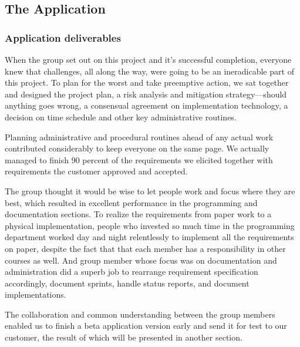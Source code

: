 \subsection{The Application}
    \subsubsection{Application deliverables}
    When the group set out on this project and it's successful completion, everyone knew that challenges, all along the way, were going to be an ineradicable part of this project. To plan for the worst and take preemptive action, we sat together and designed the project plan, a risk analysis and mitigation strategy---should anything goes wrong, a consensual agreement on implementation technology, a decision on time schedule and other key administrative routines.

    Planning administrative and procedural routines ahead of any actual work contributed considerably to keep everyone on the same page. We actually managed to finish 90 percent of the requirements we elicited together with requirements the customer approved and accepted.

    The group thought it would be wise to let people work and focus where they are best, which resulted in excellent performance in the programming and documentation sections. To realize the requirements from paper work to a physical implementation, people who invested so much time in the programming department worked day and night relentlessly to implement all the requirements on paper, despite the fact that that each member has a responsibility in other courses as well. And group member whose focus was on documentation and administration did a superb job to rearrange requirement specification accordingly, document sprints, handle status reports, and document implementations.

    The collaboration and common understanding between the group members enabled us to finish a beta application version early and send it for test to our customer, the result of which will be presented in another section.

